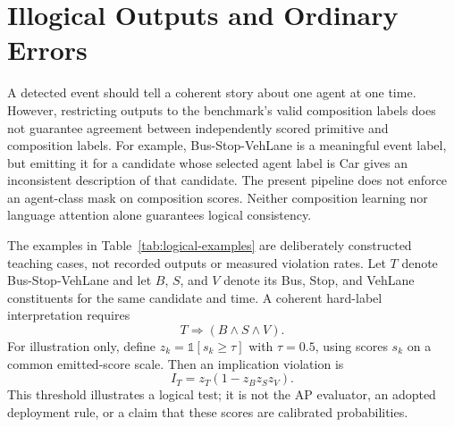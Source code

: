 \section{Illogical Outputs and Ordinary Errors}
\label{sec:illogical-examples}

A detected event should tell a coherent story about one agent at one time. However, restricting outputs to the benchmark's valid composition labels does not guarantee agreement between independently scored primitive and composition labels. For example, Bus-Stop-VehLane is a meaningful event label, but emitting it for a candidate whose selected agent label is Car gives an inconsistent description of that candidate. The present pipeline does not enforce an agent-class mask on composition scores. Neither composition learning nor language attention alone guarantees logical consistency.

The examples in Table~\ref{tab:logical-examples} are deliberately constructed teaching cases, not recorded outputs or measured violation rates. Let $T$ denote Bus-Stop-VehLane and let $B$, $S$, and $V$ denote its Bus, Stop, and VehLane constituents for the same candidate and time. A coherent hard-label interpretation requires
\begin{equation}
T\Rightarrow (B\land S\land V).
\label{eq:event-implication}
\end{equation}
For illustration only, define $z_k=\mathbb{1}[s_k\geq\tau]$ with $\tau=0.5$, using scores $s_k$ on a common emitted-score scale. Then an implication violation is
\begin{equation}
I_T=z_T\left(1-z_Bz_Sz_V\right).
\label{eq:illustrative-violation}
\end{equation}
This threshold illustrates a logical test; it is not the AP evaluator, an adopted deployment rule, or a claim that these scores are calibrated probabilities.

